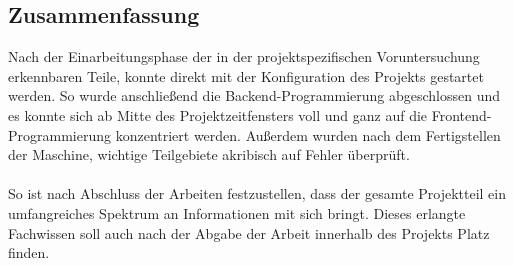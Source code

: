 \subsection{Zusammenfassung}
Nach der Einarbeitungsphase der in der projektspezifischen Voruntersuchung erkennbaren Teile, konnte direkt mit der Konfiguration des Projekts gestartet werden.
So wurde anschließend die Backend-Programmierung abgeschlossen und es konnte sich ab Mitte des Projektzeitfensters voll und ganz auf die Frontend-Programmierung konzentriert werden.
Außerdem wurden nach dem Fertigstellen der Maschine, wichtige Teilgebiete akribisch auf Fehler überprüft.\\\\
\newpage
So ist nach Abschluss der Arbeiten festzustellen, dass der gesamte Projektteil ein umfangreiches Spektrum an Informationen mit sich bringt.
Dieses erlangte Fachwissen soll auch nach der Abgabe der Arbeit innerhalb des Projekts Platz finden.
